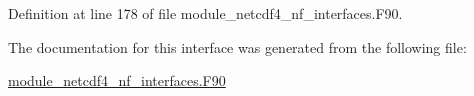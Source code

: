 Definition at line 178 of file module\+\_\+netcdf4\+\_\+nf\+\_\+interfaces.\+F90.



The documentation for this interface was generated from the following file\+:\begin{DoxyCompactItemize}
\item 
\hyperlink{module__netcdf4__nf__interfaces_8F90}{module\+\_\+netcdf4\+\_\+nf\+\_\+interfaces.\+F90}\end{DoxyCompactItemize}
